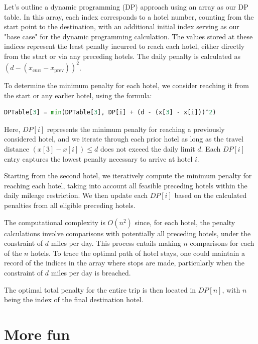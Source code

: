 \documentclass[11pt]{article}
\begin{document}
\begin{enumerate}
Let's outline a dynamic programming (DP) approach using an array as our DP table. In this array, each index corresponds to a hotel number, counting from the start point to the destination, with an additional initial index serving as our "base case" for the dynamic programming calculation. The values stored at these indices represent the least penalty incurred to reach each hotel, either directly from the start or via any preceding hotels. The daily penalty is calculated as $(d - (x_{\text{curr}} - x_{\text{prev}}))^2$.

To determine the minimum penalty for each hotel, we consider reaching it from the start or any earlier hotel, using the formula:

\begin{lstlisting}[language=Python]
DPTable[3] = min(DPTable[3], DP[i] + (d - (x[3] - x[i]))^2)
\end{lstlisting}

Here, $DP[i]$ represents the minimum penalty for reaching a previously considered hotel, and we iterate through each prior hotel as long as the travel distance $(x[3] - x[i]) \leq d$ does not exceed the daily limit $d$. Each $DP[i]$ entry captures the lowest penalty necessary to arrive at hotel $i$.

Starting from the second hotel, we iteratively compute the minimum penalty for reaching each hotel, taking into account all feasible preceding hotels within the daily mileage restriction. We then update each $DP[i]$ based on the calculated penalties from all eligible preceding hotels.

The computational complexity is $O(n^2)$ since, for each hotel, the penalty calculations involve comparisons with potentially all preceding hotels, under the constraint of $d$ miles per day. This process entails making $n$ comparisons for each of the $n$ hotels. To trace the optimal path of hotel stays, one could maintain a record of the indices in the array where stops are made, particularly when the constraint of $d$ miles per day is breached.

The optimal total penalty for the entire trip is then located in $DP[n]$, with $n$ being the index of the final destination hotel.

\end{enumerate}

\section*{More fun}
\end{document}
